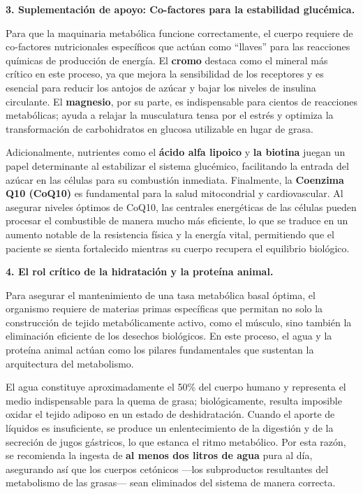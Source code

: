 \documentclass[
  spanish,
]{article}
\begin{document}
\textbf{3. Suplementación de apoyo: Co-factores para la estabilidad glucémica.}

Para que la maquinaria metabólica funcione correctamente, el cuerpo requiere de co-factores nutricionales específicos que actúan como ``llaves'' para las reacciones químicas de producción de energía. El \textbf{cromo} destaca como el mineral más crítico en este proceso, ya que mejora la sensibilidad de los receptores y es esencial para reducir los antojos de azúcar y bajar los niveles de insulina circulante. El \textbf{magnesio}, por su parte, es indispensable para cientos de reacciones metabólicas; ayuda a relajar la musculatura tensa por el estrés y optimiza la transformación de carbohidratos en glucosa utilizable en lugar de grasa.

Adicionalmente, nutrientes como el \textbf{ácido alfa lipoico} y \textbf{la biotina} juegan un papel determinante al estabilizar el sistema glucémico, facilitando la entrada del azúcar en las células para su combustión inmediata. Finalmente, la \textbf{Coenzima Q10 (CoQ10)} es fundamental para la salud mitocondrial y cardiovascular. Al asegurar niveles óptimos de CoQ10, las centrales energéticas de las células pueden procesar el combustible de manera mucho más eficiente, lo que se traduce en un aumento notable de la resistencia física y la energía vital, permitiendo que el paciente se sienta fortalecido mientras su cuerpo recupera el equilibrio biológico.

\textbf{4. El rol crítico de la hidratación y la proteína animal.}

Para asegurar el mantenimiento de una tasa metabólica basal óptima, el organismo requiere de materias primas específicas que permitan no solo la construcción de tejido metabólicamente activo, como el músculo, sino también la eliminación eficiente de los desechos biológicos. En este proceso, el agua y la proteína animal actúan como los pilares fundamentales que sustentan la arquitectura del metabolismo.

El agua constituye aproximadamente el 50\% del cuerpo humano y representa el medio indispensable para la quema de grasa; biológicamente, resulta imposible oxidar el tejido adiposo en un estado de deshidratación. Cuando el aporte de líquidos es insuficiente, se produce un enlentecimiento de la digestión y de la secreción de jugos gástricos, lo que estanca el ritmo metabólico. Por esta razón, se recomienda la ingesta de \textbf{al menos dos litros de agua} pura al día, asegurando así que los cuerpos cetónicos ---los subproductos resultantes del metabolismo de las grasas--- sean eliminados del sistema de manera correcta.
\end{document}
